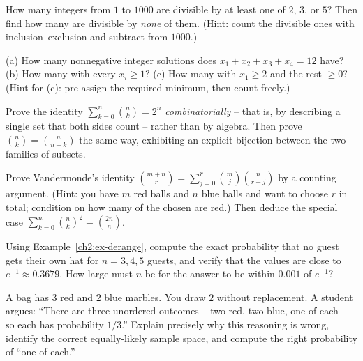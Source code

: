 \begin{exercise}
\label{ch2:exr-incexc}
How many integers from $1$ to $1000$ are divisible by at least one of $2$, $3$, or $5$?
Then find how many are divisible by \emph{none} of them. (Hint: count the divisible ones
with inclusion--exclusion and subtract from $1000$.)
\end{exercise}

\begin{exercise}
\label{ch2:exr-stars}
(a) How many nonnegative integer solutions does $x_1 + x_2 + x_3 + x_4 = 12$ have?
(b) How many with every $x_i \ge 1$? (c) How many with $x_1 \ge 2$ and the rest $\ge 0$?
(Hint for (c): pre-assign the required minimum, then count freely.)
\end{exercise}

\begin{exercise}
\label{ch2:exr-bijection}
Prove the identity $\sum_{k=0}^{n} \binom{n}{k} = 2^n$ \emph{combinatorially} -- that is,
by describing a single set that both sides count -- rather than by algebra. Then prove
$\binom{n}{k} = \binom{n}{n-k}$ the same way, exhibiting an explicit bijection between the
two families of subsets.
\end{exercise}

\begin{exercise}
\label{ch2:exr-vandermonde}
Prove Vandermonde's identity
$\binom{m+n}{r} = \sum_{j=0}^{r}\binom{m}{j}\binom{n}{r-j}$
by a counting argument. (Hint: you have $m$ red balls and $n$ blue balls and want to choose
$r$ in total; condition on how many of the chosen are red.) Then deduce the special case
$\sum_{k=0}^{n}\binom{n}{k}^2 = \binom{2n}{n}$.
\end{exercise}

\begin{exercise}
\label{ch2:exr-derange}
Using Example~\ref{ch2:ex-derange}, compute the exact probability that no guest gets their
own hat for $n = 3, 4, 5$ guests, and verify that the values are close to
$e^{-1} \approx 0.3679$. How large must $n$ be for the answer to be within $0.001$ of
$e^{-1}$?
\end{exercise}

\begin{exercise}
\label{ch2:exr-model}
A bag has $3$ red and $2$ blue marbles. You draw $2$ without replacement. A student argues:
``There are three unordered outcomes -- two red, two blue, one of each -- so each has
probability $1/3$.'' Explain precisely why this reasoning is wrong, identify the correct
equally-likely sample space, and compute the right probability of ``one of each.''
\end{exercise}
